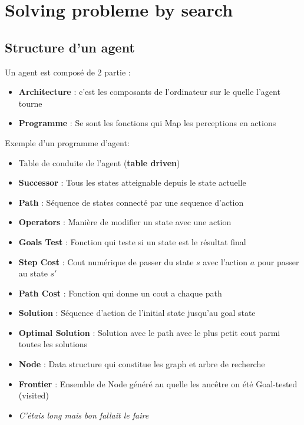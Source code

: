 \section{ Solving probleme by search}
\subsection{Structure d'un agent}
	Un agent est composé de 2 partie :
	\begin{itemize}
		\item \textbf{Architecture} : c'est les composants de l'ordinateur sur le quelle l'agent tourne
		\item \textbf{Programme} : Se sont les fonctions qui Map les perceptions en actions
	\end{itemize}
	
	Exemple d'un programme d'agent:
	
	\begin{itemize}
		\item Table de conduite de l'agent (\textbf{table driven})\\
		\item \textbf{Successor} : Tous les states atteignable depuis le state actuelle\\
		\item \textbf{Path} : Séquence de states connecté par une sequence d'action\\
		\item \textbf{Operators} : Manière de modifier un state avec une action\\
		\item \textbf{Goals Test} : Fonction qui teste si un state est le résultat final\\
		\item \textbf{Step Cost} : Cout numérique de passer du state $s$ avec l'action $a$ pour passer au state $s'$\\
		\item \textbf{Path Cost} : Fonction qui donne un cout a chaque path\\
		\item \textbf{Solution} : Séquence d'action de l'initial state jusqu'au goal state\\
		\item \textbf{Optimal Solution} : Solution avec le path avec le plus petit cout parmi toutes les solutions\\
		\item \textbf{Node} : Data structure qui constitue les graph et arbre de recherche\\
		\item \textbf{Frontier} : Ensemble de Node généré au quelle les ancêtre on été Goal-tested (visited)\\
		
		\item \textit{C'étais long mais bon fallait le faire}
		
	\end{itemize}
